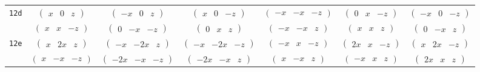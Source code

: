 \documentclass[fleqn,9pt,landscape]{jsarticle}
\begin{document}
\begin{center}
\begin{longtable}{ccccccc}
{\tt 12d} & $ \begin{pmatrix} x & 0 & z \end{pmatrix} $ & $ \begin{pmatrix} - x & 0 & z \end{pmatrix} $ & $ \begin{pmatrix} x & 0 & - z \end{pmatrix} $ & $ \begin{pmatrix} - x & - x & - z \end{pmatrix} $ & $ \begin{pmatrix} 0 & x & - z \end{pmatrix} $ & $ \begin{pmatrix} - x & 0 & - z \end{pmatrix} $ \\
& $ \begin{pmatrix} x & x & - z \end{pmatrix} $ & $ \begin{pmatrix} 0 & - x & - z \end{pmatrix} $ & $ \begin{pmatrix} 0 & x & z \end{pmatrix} $ & $ \begin{pmatrix} - x & - x & z \end{pmatrix} $ & $ \begin{pmatrix} x & x & z \end{pmatrix} $ & $ \begin{pmatrix} 0 & - x & z \end{pmatrix} $ \\ \hline
{\tt 12e} & $ \begin{pmatrix} x & 2 x & z \end{pmatrix} $ & $ \begin{pmatrix} - x & - 2 x & z \end{pmatrix} $ & $ \begin{pmatrix} - x & - 2 x & - z \end{pmatrix} $ & $ \begin{pmatrix} - x & x & - z \end{pmatrix} $ & $ \begin{pmatrix} 2 x & x & - z \end{pmatrix} $ & $ \begin{pmatrix} x & 2 x & - z \end{pmatrix} $ \\
& $ \begin{pmatrix} x & - x & - z \end{pmatrix} $ & $ \begin{pmatrix} - 2 x & - x & - z \end{pmatrix} $ & $ \begin{pmatrix} - 2 x & - x & z \end{pmatrix} $ & $ \begin{pmatrix} x & - x & z \end{pmatrix} $ & $ \begin{pmatrix} - x & x & z \end{pmatrix} $ & $ \begin{pmatrix} 2 x & x & z \end{pmatrix} $ \\ \hline

\end{longtable}
\end{center}
\end{document}
